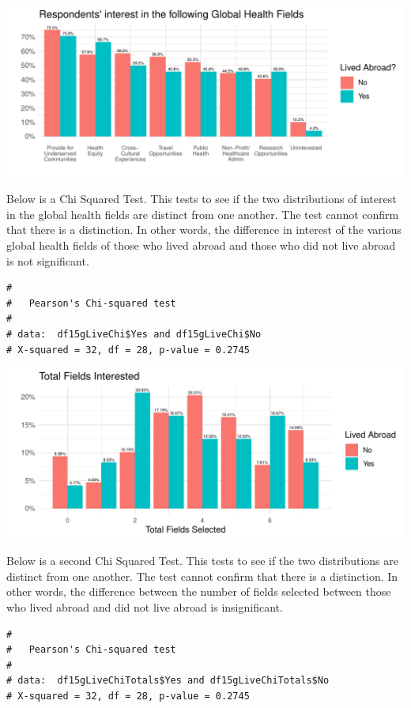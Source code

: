 \documentclass[
  letterpaper,
  DIV=11,
  numbers=noendperiod]{scrartcl}
\begin{document}
\includegraphics{GlobalHealthQuarto1-5_files/figure-pdf/unnamed-chunk-24-1.pdf}

\newpage

Below is a Chi Squared Test. This tests to see if the two distributions
of interest in the global health fields are distinct from one another.
The test cannot confirm that there is a distinction. In other words, the
difference in interest of the various global health fields of those who
lived abroad and those who did not live abroad is not significant.

\begin{verbatim}
# 
#   Pearson's Chi-squared test
# 
# data:  df15gLiveChi$Yes and df15gLiveChi$No
# X-squared = 32, df = 28, p-value = 0.2745
\end{verbatim}

\includegraphics{GlobalHealthQuarto1-5_files/figure-pdf/unnamed-chunk-26-1.pdf}

Below is a second Chi Squared Test. This tests to see if the two
distributions are distinct from one another. The test cannot confirm
that there is a distinction. In other words, the difference between the
number of fields selected between those who lived abroad and did not
live abroad is insignificant.

\begin{verbatim}
# 
#   Pearson's Chi-squared test
# 
# data:  df15gLiveChiTotals$Yes and df15gLiveChiTotals$No
# X-squared = 32, df = 28, p-value = 0.2745
\end{verbatim}
\end{document}
